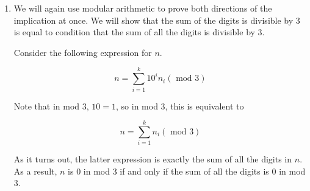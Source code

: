 \begin{solution}
\begin{enumerate}
\item We will again use modular arithmetic to prove both directions of the
implication at once. We will show that the sum of the digits is divisible by 3
is equal to condition that the sum of all the digits is divisible by 3.

Consider the following expression for $n$.

$$n = \sum_{i=1}^k 10^i n_i (\text{ mod } 3)$$

Note that in mod 3, $10 = 1$, so in mod 3, this is equivalent to

$$n = \sum_{i=1}^k n_i (\text{ mod } 3)$$

As it turns out, the latter expression is exactly the sum of all the digits
in $n$. As a result, $n$ is 0 in mod 3 if and only if the sum of all the
digits is 0 in mod 3.

\end{enumerate}
\end{solution}